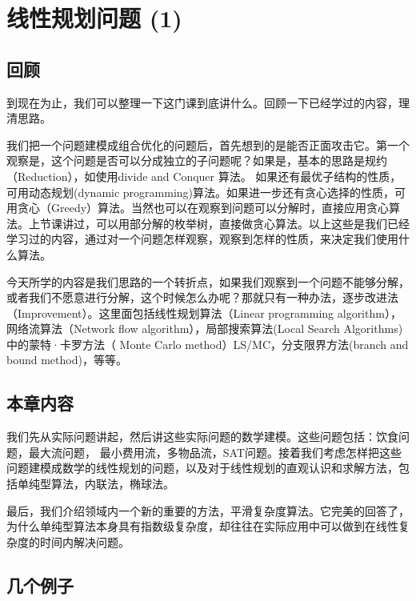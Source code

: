 

\chapter{ 线性规划问题 (1) }

\section{回顾}
到现在为止，我们可以整理一下这门课到底讲什么。回顾一下已经学过的内容，理清思路。

我们把一个问题建模成组合优化的问题后，首先想到的是能否正面攻击它。第一个观察是，这个问题是否可以分成独立的子问题呢？如果是，基本的思路是规约（Reduction），如使用divide and Conquer 算法。 如果还有最优子结构的性质，可用动态规划(dynamic programming)算法。如果进一步还有贪心选择的性质，可用贪心（Greedy）算法。当然也可以在观察到问题可以分解时，直接应用贪心算法。上节课讲过，可以用部分解的枚举树，直接做贪心算法。以上这些是我们已经学习过的内容，通过对一个问题怎样观察，观察到怎样的性质，来决定我们使用什么算法。

今天所学的内容是我们思路的一个转折点，如果我们观察到一个问题不能够分解，或者我们不愿意进行分解，这个时候怎么办呢？那就只有一种办法，逐步改进法（Improvement）。这里面包括线性规划算法（Linear programming algorithm），网络流算法（Network flow algorithm），局部搜索算法(Local Search Algorithms) 中的蒙特·卡罗方法（ Monte Carlo method）LS/MC，分支限界方法(branch and bound method)，等等。

\section{本章内容}

我们先从实际问题讲起，然后讲这些实际问题的数学建模。这些问题包括：饮食问题，最大流问题， 最小费用流，多物品流，SAT问题。接着我们考虑怎样把这些问题建模成数学的线性规划的问题，以及对于线性规划的直观认识和求解方法，包括单纯型算法，内联法，椭球法。

最后，我们介绍领域内一个新的重要的方法，平滑复杂度算法。它完美的回答了，为什么单纯型算法本身具有指数级复杂度，却往往在实际应用中可以做到在线性复杂度的时间内解决问题。

\section{几个例子}

